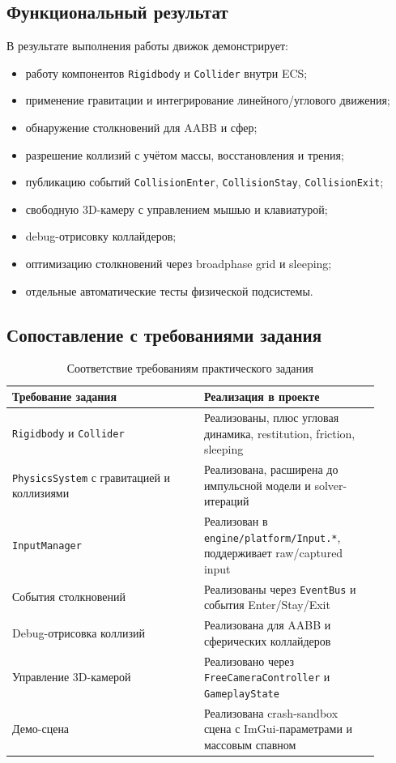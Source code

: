 \documentclass[a4paper,14pt]{extarticle}
\DeclareRobustCommand{\code}[1]{\nolinkurl{#1}}
\begin{document}
\subsection{Функциональный результат}
В результате выполнения работы движок демонстрирует:
\begin{itemize}
  \item работу компонентов \texttt{Rigidbody} и \texttt{Collider} внутри ECS;
  \item применение гравитации и интегрирование линейного/углового движения;
  \item обнаружение столкновений для AABB и сфер;
  \item разрешение коллизий с учётом массы, восстановления и трения;
  \item публикацию событий \texttt{CollisionEnter}, \texttt{CollisionStay}, \texttt{CollisionExit};
  \item свободную 3D-камеру с управлением мышью и клавиатурой;
  \item debug-отрисовку коллайдеров;
  \item оптимизацию столкновений через broadphase grid и sleeping;
  \item отдельные автоматические тесты физической подсистемы.
\end{itemize}

\subsection{Сопоставление с требованиями задания}
\begin{table}[H]
\centering
\begin{tabular}{p{0.47\linewidth} p{0.43\linewidth}}
\toprule
\textbf{Требование задания} & \textbf{Реализация в проекте} \\
\midrule
\texttt{Rigidbody} и \texttt{Collider} & Реализованы, плюс угловая динамика, restitution, friction, sleeping \\
\texttt{PhysicsSystem} с гравитацией и коллизиями & Реализована, расширена до импульсной модели и solver-итераций \\
\texttt{InputManager} & Реализован в \code{engine/platform/Input.*}, поддерживает raw/captured input \\
События столкновений & Реализованы через \texttt{EventBus} и события Enter/Stay/Exit \\
Debug-отрисовка коллизий & Реализована для AABB и сферических коллайдеров \\
Управление 3D-камерой & Реализовано через \texttt{FreeCameraController} и \texttt{GameplayState} \\
Демо-сцена & Реализована crash-sandbox сцена с ImGui-параметрами и массовым спавном \\
\bottomrule
\end{tabular}
\caption{Соответствие требованиям практического задания}
\label{tab:requirements}
\end{table}
\end{document}
